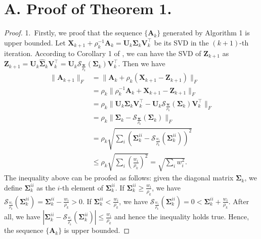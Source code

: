 \documentclass[10pt,twocolumn,letterpaper]{article}
\begin{document}
\section{A. Proof of Theorem 1.}
\begin{proof}
1.\ Firstly, we proof that the sequence $\{\mathbf{A}_{k}\}$ generated by Algorithm 1 is upper bounded.
Let $\mathbf{X}_{k+1}+\rho_{k}^{-1}\mathbf{A}_{k}
=
\mathbf{U}_{k}\mathbf{\Sigma}_{k}\mathbf{V}_{k}^{\top}$
be its SVD in the $(k+1)$-th iteration. According to Corollary 1 of \cite{wnnmijcv}, we can have the SVD of $\mathbf{Z}_{k+1}$ as $\mathbf{Z}_{k+1}=\mathbf{U}_{k}\hat{\mathbf{\Sigma}}_{k}\mathbf{V}_{k}^{\top}=\mathbf{U}_{k}\mathcal{S}_{\frac{\bm{w}}{\rho_{k}}}(\mathbf{\Sigma}_{k})\mathbf{V}_{k}^{\top}$. 
Then we have 
\begin{align}
\|
\mathbf{A}_{k+1}
\|_{F}
&
=
\|
\mathbf{A}_{k}
+
\rho_{k}
(\mathbf{X}_{k+1}-\mathbf{Z}_{k+1})
\|_{F}
\\
&
=
\rho_{k}\|
\rho_{k}^{-1}
\mathbf{A}_{k}
+
\mathbf{X}_{k+1}
-
\mathbf{Z}_{k+1}
\|_{F}
\\
&
=
\rho_{k}\|
\mathbf{U}_{k}\mathbf{\Sigma}_{k}\mathbf{V}_{k}^{\top}
-
\mathbf{U}_{k}\mathcal{S}_{\frac{\bm{w}}{\rho_{k}}}(\mathbf{\Sigma}_{k})\mathbf{V}_{k}^{\top}
\|_{F}
\\
&
=
\rho_{k}\|
\mathbf{\Sigma}_{k}
-
\mathcal{S}_{\frac{\bm{w}}{\rho_{k}}}(\mathbf{\Sigma}_{k})
\|_{F}
\\
&
=
\rho_{k}
\sqrt{\sum_{i}(\mathbf{\Sigma}_{k}^{ii}-\mathcal{S}_{\frac{w_{i}}{\rho_{k}}}(\mathbf{\Sigma}_{k}^{ii}))^{2}}
\\
&
\le
\rho_{k}
\sqrt{\sum_{i}(\frac{w_{i}}{\rho_{k}})^{2}}
=
\sqrt{\sum_{i}w_{i}^{2}}.
\end{align}
The inequality above can be proofed as follows: given the diagonal matrix $\mathbf{\Sigma}_{k}$, we define $\mathbf{\Sigma}_{k}^{ii}$ as the $i$-th element of $\mathbf{\Sigma}_{k}^{ii}$. If $\mathbf{\Sigma}_{k}^{ii}\ge\frac{w_{i}}{\rho_{k}}$, we have $\mathcal{S}_{\frac{w_{i}}{\rho_{k}}}(\mathbf{\Sigma}_{k}^{ii})=\mathbf{\Sigma}_{k}^{ii}-\frac{w_{i}}{\rho_{k}}>0$. If $\mathbf{\Sigma}_{k}^{ii}<\frac{w_{i}}{\rho_{k}}$, we have $\mathcal{S}_{\frac{w_{i}}{\rho_{k}}}(\mathbf{\Sigma}_{k}^{ii})=0<\mathbf{\Sigma}_{k}^{ii}+\frac{w_{i}}{\rho_{k}}$. After all, we have $|\mathbf{\Sigma}_{k}^{ii}-\mathcal{S}_{\frac{w_{i}}{\rho_{k}}}(\mathbf{\Sigma}_{k}^{ii})|\le\frac{w_{i}}{\rho_{k}}$ and hence the inequality holds true. Hence, the sequence $\{\mathbf{A}_{k}\}$ is upper bounded.


\end{proof}
\end{document}
